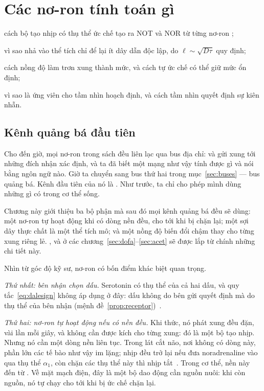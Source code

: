 \chapter{Các nơ-ron  tính toán gì}
\label{sec:serocomputer}
\begin{chaptergoals}
\item cách bộ tạo nhịp có thụ thể ức chế tạo ra NOT và NOR từ từng nơ-ron ;
\item vì sao nhả vào thể tích chỉ để lại ít dây dẫn độc lập, do $\ell\sim\sqrt{D\tau}$ quy định;
\item cách nồng độ làm trơn xung thành mức, và cách tự ức chế có thể giữ mức ổn định;
\item vì sao  là ứng viên cho tầm nhìn hoạch định, và cách tầm nhìn quyết định sự kiên nhẫn.
\end{chaptergoals}

\section{Kênh quảng bá đầu tiên}

Cho đến giờ, mọi nơ-ron trong sách đều liên lạc qua bus địa chỉ:  và  gửi xung tới những đích nhận xác định, và ta đã biết một mạng như vậy tính được gì và nói bằng ngôn ngữ nào. Giờ ta chuyển sang bus thứ hai trong mục~\ref{sec:buses} --- bus quảng bá. Kênh đầu tiên của nó là . Như trước, ta chỉ cho phép mình dùng những gì có trong cơ thể sống.

Chương này giới thiệu ba bộ phận mà sau đó mọi kênh quảng bá đều sẽ dùng: một nơ-ron tự hoạt động khi có dòng nền đều, cho tới khi bị chặn lại; một sợi dây thực chất là một thể tích mô; và một nồng độ biến đổi chậm thay cho từng xung riêng lẻ. ,  và  ở các chương~\ref{sec:dofa}--\ref{sec:acet} sẽ được lắp từ chính những chi tiết này.

Nhìn từ góc độ kỹ sư, nơ-ron  có bốn điểm khác biệt quan trọng.

\emph{Thứ nhất: bên nhận chọn dấu.} Serotonin có thụ thể của cả hai dấu, và quy tắc~\eqref{eq:dalesign} không áp dụng ở đây: dấu không do bên gửi quyết định mà do thụ thể của bên nhận (mệnh đề~\ref{prop:receptor})~\cite{BarnesSharp1999}.

\emph{Thứ hai: nơ-ron  tự hoạt động nếu có nền đều.} Khi thức, nó phát xung đều đặn, vài lần mỗi giây, và không cần được kích cho từng xung: đó là một bộ tạo nhịp. Nhưng nó cần một dòng nền liên tục. Trong lát cắt não, nơi không có dòng này, phần lớn các tế bào như vậy im lặng; nhịp đều trở lại nếu đưa noradrenaline vào qua thụ thể $\alpha_1$, còn chặn các thụ thể này thì nhịp tắt~\cite{VandermaelenAghajanian1983}. Trong cơ thể, nền này đến từ . Về mặt mạch điện, đây là một bộ dao động cần nguồn nuôi: khi còn nguồn, nó tự chạy cho tới khi bị ức chế chặn lại.

